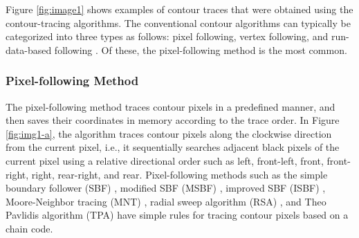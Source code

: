 Figure \ref{fig:image1} shows examples of contour traces that were obtained using the contour-tracing algorithms. The conventional contour algorithms can typically be categorized into three types as follows: pixel following, vertex following, and run-data-based following \cite{Miyatake1997Contour,Danielsson1981Improvement,Shoji1999Contour}. Of these, the pixel-following method is the most common.

\subsubsection{Pixel-following Method}


The pixel-following method traces contour pixels in a predefined manner, and then saves their coordinates in memory according to the trace order. In Figure \ref{fig:img1-a}, the algorithm traces contour pixels along the clockwise direction from the current pixel, i.e., it sequentially searches adjacent black pixels of the current pixel using a relative directional order such as left, front-left, front, front-right, right, rear-right, and rear. Pixel-following methods such as the simple boundary follower (SBF) \cite{Pitas2000Digital,Das1990Bivariate,Papert1973Uses}, modified SBF (MSBF) \cite{Gose1996Pattern}, improved SBF (ISBF) \cite{Cheong2006Improved}, Moore-Neighbor tracing (MNT) \cite{Toussaint????Grids}, radial sweep algorithm (RSA) \cite{Mirante1982Radial}, and Theo Pavlidis algorithm (TPA) \cite{Pavlidis2012Algorithms} have simple rules for tracing contour pixels based on a chain code. 

